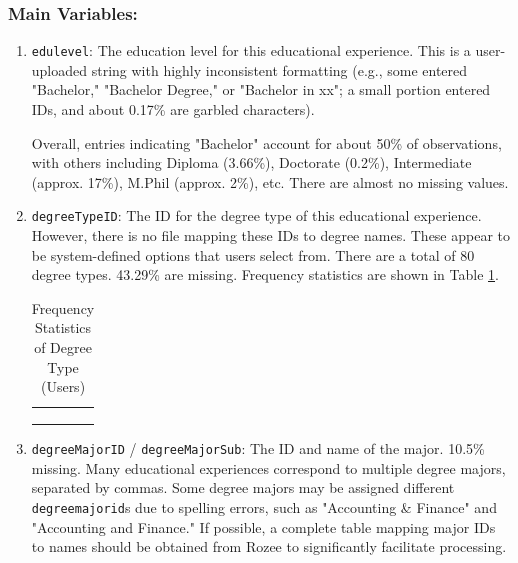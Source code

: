 \documentclass[12pt]{article}
\begin{document}
\subsubsection*{\textbf{Main Variables}:}
    \begin{enumerate}
        \item \texttt{edulevel}: The education level for this educational experience. This is a user-uploaded string with highly inconsistent formatting (e.g., some entered "Bachelor," "Bachelor Degree," or "Bachelor in xx"; a small portion entered IDs, and about 0.17\% are garbled characters). 
        
        Overall, entries indicating "Bachelor" account for about 50\% of observations, with others including Diploma (3.66\%), Doctorate (0.2\%), Intermediate (approx. 17\%), M.Phil (approx. 2\%), etc. There are almost no missing values.
        \item \texttt{degreeTypeID}: The ID for the degree type of this educational experience. However, there is no file mapping these IDs to degree names. These appear to be system-defined options that users select from. There are a total of 80 degree types. 43.29\% are missing. Frequency statistics are shown in Table \ref{tab:users_freq7}.

\begin{table}[]
\tiny
    \caption{Frequency Statistics of Degree Type (Users)}
    \centering
    \begin{tabular}{cccc}
\hline
\hline
\vspace{-0.2cm}
\\
 \\
\vspace{-0.3cm} \\
\hline 
\hline
    \end{tabular}
    \label{tab:users_freq7}
\end{table}



        
        \item \texttt{degreeMajorID} / \texttt{degreeMajorSub}: The ID and name of the major. 10.5\% missing. Many educational experiences correspond to multiple degree majors, separated by commas. Some degree majors may be assigned different \texttt{degreemajorid}s due to spelling errors, such as "Accounting \& Finance" and "Accounting and Finance." If possible, a complete table mapping major IDs to names should be obtained from Rozee to significantly facilitate processing.


\end{enumerate}
\end{document}

